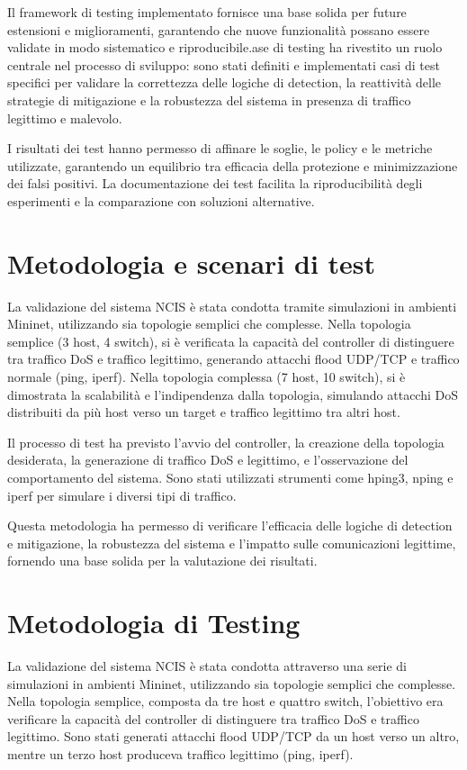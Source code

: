 Il framework di testing implementato fornisce una base solida per future estensioni e miglioramenti, garantendo che nuove funzionalità possano essere validate in modo sistematico e riproducibile.ase di testing ha rivestito un ruolo centrale nel processo di sviluppo: sono stati definiti e implementati casi di test specifici per validare la correttezza delle logiche di detection, la reattività delle strategie di mitigazione e la robustezza del sistema in presenza di traffico legittimo e malevolo.\par
I risultati dei test hanno permesso di affinare le soglie, le policy e le metriche utilizzate, garantendo un equilibrio tra efficacia della protezione e minimizzazione dei falsi positivi. La documentazione dei test facilita la riproducibilità degli esperimenti e la comparazione con soluzioni alternative.
\section{Metodologia e scenari di test}
La validazione del sistema NCIS è stata condotta tramite simulazioni in ambienti Mininet, utilizzando sia topologie semplici che complesse. Nella topologia semplice (3 host, 4 switch), si è verificata la capacità del controller di distinguere tra traffico DoS e traffico legittimo, generando attacchi flood UDP/TCP e traffico normale (ping, iperf). Nella topologia complessa (7 host, 10 switch), si è dimostrata la scalabilità e l’indipendenza dalla topologia, simulando attacchi DoS distribuiti da più host verso un target e traffico legittimo tra altri host.\par
Il processo di test ha previsto l’avvio del controller, la creazione della topologia desiderata, la generazione di traffico DoS e legittimo, e l’osservazione del comportamento del sistema. Sono stati utilizzati strumenti come hping3, nping e iperf per simulare i diversi tipi di traffico.\par
Questa metodologia ha permesso di verificare l’efficacia delle logiche di detection e mitigazione, la robustezza del sistema e l’impatto sulle comunicazioni legittime, fornendo una base solida per la valutazione dei risultati.
\section{Metodologia di Testing}

La validazione del sistema NCIS è stata condotta attraverso una serie di simulazioni in ambienti Mininet, utilizzando sia topologie semplici che complesse. Nella topologia semplice, composta da tre host e quattro switch, l’obiettivo era verificare la capacità del controller di distinguere tra traffico DoS e traffico legittimo. Sono stati generati attacchi flood UDP/TCP da un host verso un altro, mentre un terzo host produceva traffico legittimo (ping, iperf).

